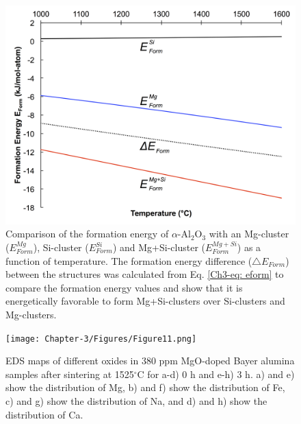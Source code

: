 \newpage
\begin{figure}[H]
	\centering
	\includegraphics[width=\textwidth]{Chapter-3/Figures/Figure10.png}
	\caption{Comparison of the formation energy of $\alpha$-Al$_{2}$O$_{3}$ with an Mg-cluster ($E_{Form}^{Mg}$), Si-cluster ($E_{Form}^{Si}$) and Mg+Si-cluster ($E_{Form}^{Mg+Si}$) as a function of temperature. The formation energy difference ($\bigtriangleup E_{Form}$) between the structures was calculated from Eq. \ref{Ch3-eq: eform} to compare the formation energy values and show that it is energetically favorable to form Mg+Si-clusters over Si-clusters and Mg-clusters.}
	\label{Ch3-figure:Figure10}
\end{figure}

\newpage
\begin{figure}[H]
	\centering
	\texttt{[image: Chapter-3/Figures/Figure11.png]}
	\caption{EDS maps of different oxides in 380 ppm MgO-doped Bayer alumina samples after sintering at 1525$^{\circ}$C for a-d) 0 h and e-h) 3 h. a) and e)  show the distribution of Mg, b) and f) show the distribution of Fe, c) and g) show the distribution of Na, and d) and h) show the distribution of Ca.}
	\label{Ch3-figure:Figure11}
\end{figure}

